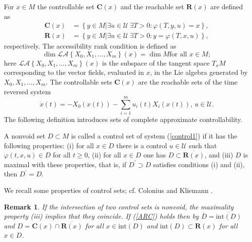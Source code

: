 \documentclass{siamltex}%
\newtheorem{remark}[theorem]{Remark}
\begin{document}
For $x\in M$ the controllable set $\mathbf{C}(x)$ and the reachable set
$\mathbf{R}(x)$ are defined as
\begin{align*}
\mathbf{C}(x)  &  =\left\{  y\in M\left\vert \exists u\in\mathcal{U}~\exists
T>0:\varphi(T,y,u)=x\right.  \right\}  ,\\
\mathbf{R}(x)  &  =\left\{  y\in M\left\vert \exists u\in\mathcal{U}~\exists
T>0:y=\varphi(T,x,u)\right.  \right\}  ,
\end{align*}
respectively. The accessibility rank condition is defined as%
\begin{equation}
\dim\mathcal{LA}\left\{  X_{0},X_{1},\ldots,X_{m}\right\}  (x)=\dim M\text{
for all }x\in M; \label{ARC}%
\end{equation}
here $\mathcal{LA}\left\{  X_{0},X_{1},\ldots,X_{m}\right\}  (x)$ is the
subspace of the tangent space $T_{x}M$ corresponding to the vector fields,
evaluated in $x$, in the Lie algebra generated by $X_{0},X_{1},\ldots,X_{m}$.
The controllable sets $\mathbf{C}(x)$ are the reachable sets of the time
reversed system%
\begin{equation}
\dot{x}(t)=-X_{0}(x(t))-\sum_{i=1}^{m}u_{i}(t)X_{i}(x(t)),\,u\in\mathcal{U}.
\label{time-reversed}%
\end{equation}
The following definition introduces sets of complete approximate controllability.

\begin{definition}
\label{Definition_control_sets}A nonvoid set $D\subset M$ is called a control
set of system (\ref{control1}) if it has the following properties: (i) for all
$x\in D$ there is a control $u\in\mathcal{U}$ such that $\varphi(t,x,u)\in D$
for all $t\geq0$, (ii) for all $x\in D$ one has $D\subset\overline
{\mathbf{R}(x)}$, and (iii) $D$ is maximal with these properties, that is, if
$D^{\prime}\supset D$ satisfies conditions (i) and (ii), then $D^{\prime}=D$.
\end{definition}

We recall some properties of control sets; cf. Colonius and Kliemann
\cite[Chp. 3]{ColK00}.

\begin{remark}
\label{Remark2.2}If the intersection of two control sets is nonvoid, the
maximality property (iii) implies that they coincide. If (\ref{ARC}) holds
then by \cite[Lemma 3.2.13(i)]{ColK00} $\overline{D}=\overline{\mathrm{int}%
(D)}$ and $D=\mathbf{C}(x)\cap\overline{\mathbf{R}(x)}$ for all $x\in
\mathrm{int}(D)$ and $\mathrm{int}(D)\subset\mathbf{R}(x)$ for all $x\in D$.
\end{remark}
\end{document}
